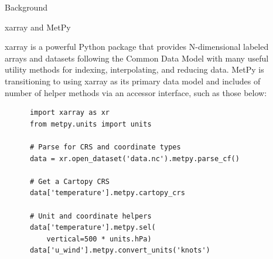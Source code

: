 \documentclass[final]{beamer}
\newlength{\sepwidth}
\newlength{\colwidth}
\newcommand{\separatorcolumn}{\begin{column}{\sepwidth}\end{column}}
\begin{document}
\begin{frame}[t, fragile]
\begin{columns}[t]
\begin{column}{\colwidth}
\begin{block}{Background}
  \end{block}

  \begin{alertblock}{xarray and MetPy}

    xarray is a powerful Python package that provides N-dimensional labeled arrays and datasets following the Common Data Model with many useful utility methods for indexing, interpolating, and reducing data. MetPy is transitioning to using xarray as its primary data model and includes of number of helper methods via an accessor interface, such as those below:

    \begin{verbatim}
      import xarray as xr
      from metpy.units import units

      # Parse for CRS and coordinate types
      data = xr.open_dataset('data.nc').metpy.parse_cf()

      # Get a Cartopy CRS
      data['temperature'].metpy.cartopy_crs

      # Unit and coordinate helpers
      data['temperature'].metpy.sel(
          vertical=500 * units.hPa)
      data['u_wind'].metpy.convert_units('knots')
    \end{verbatim}

  \end{alertblock}

\end{column}

\separatorcolumn

\begin{column}{\colwidth}

  \begin{exampleblock}

    \vspace{-1.5em}


\end{exampleblock}
\end{column}
\end{columns}
\end{frame}
\end{document}
